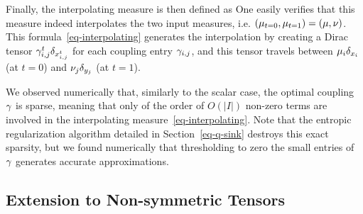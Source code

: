 Finally, the interpolating measure is then defined as
One easily verifies that this measure indeed interpolates the two input measures, i.e. 
$(\mu_{t=0},\mu_{t=1})=(\mu,\nu)$. 
%
This formula~\eqref{eq-interpolating} generates the interpolation by creating a Dirac tensor $ \gamma_{i,j}^t \delta_{x_{i,j}^t}$ for each coupling entry $\gamma_{i,j}$, and this tensor travels between $\mu_i \delta_{x_i}$ (at $t=0$) and $\nu_j \delta_{y_j}$ (at $t=1$).

\begin{rem} We observed numerically that, similarly to the scalar case, the optimal coupling $\gamma$ is sparse, meaning that only of the order of $O(|I|)$ non-zero terms are involved in the interpolating measure~\eqref{eq-interpolating}. Note that the entropic regularization algorithm detailed in Section~\ref{eq-q-sink} destroys this exact sparsity, but we found numerically that thresholding to zero the small entries of $\gamma$ generates accurate approximations. 
\end{rem}


\subsection{Extension to Non-symmetric Tensors}


\fi
